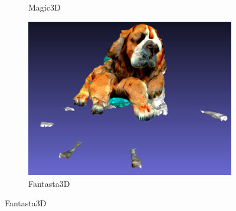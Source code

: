 \begin{figure}[ht]
\begin{subfigure}[b]{0.32\textwidth}
        \caption{Magic3D}
        \vspace{0.1cm}
    \end{subfigure}
    \begin{subfigure}[b]{0.33\textwidth}
        \centering
        \includegraphics[width=\textwidth]{figures/subjective/fantasia_dog_front_result.png}
        \caption{Fantasta3D}
        \vspace{0.1cm}
    \end{subfigure}


\end{figure}
